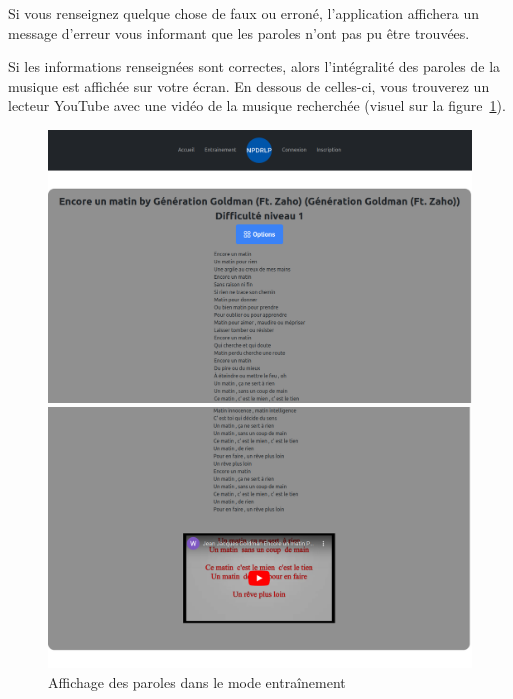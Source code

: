 \documentclass[12pt,french]{article}
\begin{document}
Si vous renseignez quelque chose de faux ou erroné, l'application affichera un message d'erreur vous informant que les paroles n'ont pas pu être trouvées.

Si les informations renseignées sont correctes, alors l'intégralité des paroles de la musique est affichée sur votre écran. En dessous de celles-ci, vous trouverez un lecteur YouTube avec une vidéo de la musique recherchée (visuel sur la figure~\ref{figure12}).

\begin{figure}[H]
	\centering
	\begin{minipage}{.5\textwidth}
		\centering
		\includegraphics[scale=0.15]{parole.png}
	\end{minipage}%
	\begin{minipage}{.5\textwidth}
		\centering
		\includegraphics[scale=0.15]{ytbparole.png}
	\end{minipage}
	\caption{Affichage des paroles dans le mode entraînement}
	\label{figure12} 
\end{figure}
\end{document}
